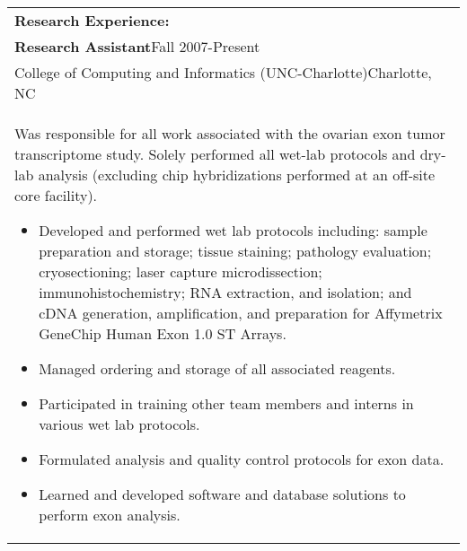 \documentclass[12pt]{report}
\newenvironment{detailsList}
{\begin{itemize}
  \setlength{\itemsep}{1pt}
  \setlength{\parskip}{0pt}
  \setlength{\parsep}{0pt}
  \setlength{\partopsep}{0pt}
  \setlength{\topsep}{0pt}}
{\end{itemize}}
\def\fullLength{6.5in}
\begin{document}
\begin{table}[!h]
\begin{tabular}{p{\fullLength}}
\textbf{\Large Research Experience:}\\
\textbf{Research Assistant}\hfill Fall 2007-Present\\
College of Computing and Informatics (UNC-Charlotte)\hfill Charlotte, NC\\
Was responsible for all work associated with the ovarian exon tumor transcriptome study. Solely performed all wet-lab protocols and dry-lab analysis (excluding chip hybridizations performed at an off-site core facility).
\begin{detailsList}
\item Developed and performed wet lab protocols including: sample preparation and storage; tissue staining; pathology evaluation; cryosectioning; laser capture microdissection; immunohistochemistry; RNA extraction, and isolation; and cDNA generation, amplification, and preparation for Affymetrix GeneChip Human Exon 1.0 ST Arrays.
\item Managed ordering and storage of all associated reagents.
\item Participated in training other team members and interns in various wet lab protocols.
\item Formulated analysis and quality control protocols for exon data.
\item Learned and developed software and database solutions to perform exon analysis.
\end{detailsList}
\end{tabular}
\end{table}

\clearpage
\end{document}
